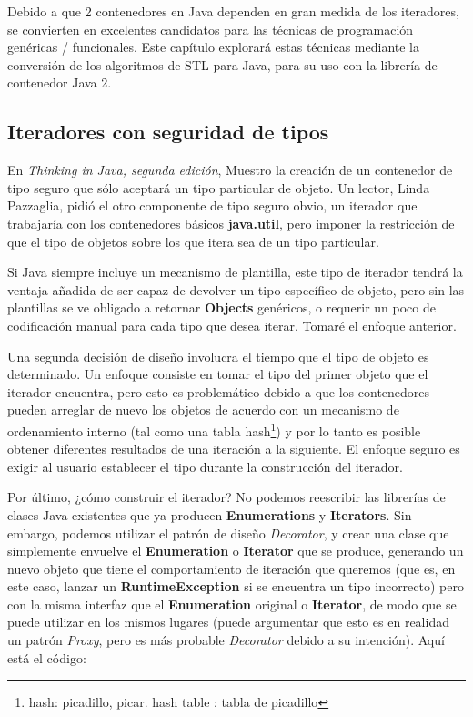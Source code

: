 Debido a que 2 contenedores en Java dependen en gran medida de los iteradores, se convierten en excelentes candidatos para las técnicas de programación genéricas / funcionales. Este capítulo explorará estas técnicas mediante la conversión de los algoritmos de STL para Java, para su uso con la librería de contenedor Java 2.  \newline


\subsection*{Iteradores con seguridad de tipos}
\label{subsec:icsdt}


En \textit{Thinking in Java, segunda edición}, Muestro la creación de un contenedor de tipo seguro que sólo aceptará un tipo particular de objeto. Un lector, Linda 
Pazzaglia, pidió el otro componente de tipo seguro obvio, un iterador que trabajaría con los contenedores básicos \textbf{java.util}, pero imponer la restricción de que el tipo de objetos sobre los que itera sea de un tipo particular. \newline

Si Java siempre incluye un mecanismo de plantilla, este tipo de iterador tendrá la ventaja añadida de ser capaz de devolver un tipo específico de objeto, pero sin las plantillas se ve obligado a retornar \textbf{Objects} genéricos, o requerir un poco de codificación manual para cada tipo que desea iterar. Tomaré el enfoque anterior.     \newline

Una segunda decisión de diseño involucra el tiempo que el tipo de objeto es determinado. Un enfoque consiste en tomar el tipo del primer objeto que el iterador encuentra, pero esto es problemático debido a que los contenedores pueden arreglar de nuevo los objetos de acuerdo con un mecanismo de ordenamiento interno (tal como una tabla hash\footnote{hash: picadillo, picar. \newline  hash table : tabla de picadillo}) y por lo tanto es posible obtener diferentes resultados de una iteración a la siguiente. El enfoque seguro es exigir al usuario establecer el tipo durante la construcción del iterador.     \newline

Por último, ¿cómo construir el iterador? No podemos reescribir las librerías de clases Java existentes que ya producen \textbf{Enumerations} y \textbf{Iterators}.  Sin embargo, podemos utilizar el patrón de diseño \textit{Decorator}, y crear una clase que simplemente envuelve el \textbf{Enumeration} o \textbf{Iterator} que se produce, generando un nuevo objeto que tiene el comportamiento de iteración que queremos (que es, en este caso, lanzar un \textbf{RuntimeException} si se encuentra un tipo incorrecto) pero con la misma interfaz que el \textbf{Enumeration} original o \textbf{Iterator}, de modo que se puede utilizar en los mismos lugares (puede argumentar que esto es en realidad un patrón \textit{Proxy}, pero es más probable \textit{Decorator} debido a su intención). Aquí está el código: \newline

